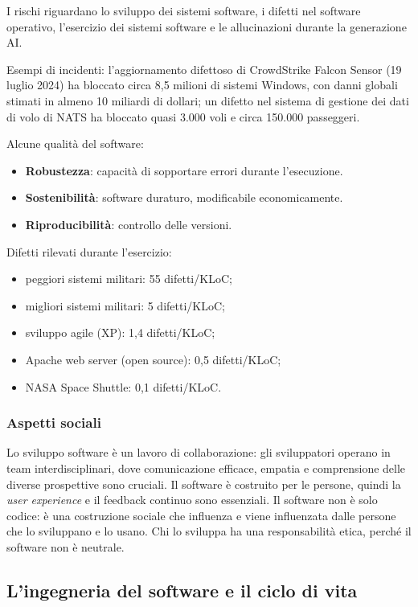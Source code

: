 \documentclass[a4paper,12pt]{article}
\begin{document}
I rischi riguardano lo sviluppo dei sistemi software, i difetti nel software operativo,
l'esercizio dei sistemi software e le allucinazioni durante la generazione AI.

Esempi di incidenti: l'aggiornamento difettoso di CrowdStrike Falcon Sensor
(19 luglio 2024) ha bloccato circa 8,5 milioni di sistemi Windows, con danni globali
stimati in almeno 10 miliardi di dollari; un difetto nel sistema di gestione dei dati
di volo di NATS ha bloccato quasi 3.000 voli e circa 150.000 passeggeri.

Alcune qualità del software:
\begin{itemize}
  \item \textbf{Robustezza}: capacità di sopportare errori durante l'esecuzione.
  \item \textbf{Sostenibilità}: software duraturo, modificabile economicamente.
  \item \textbf{Riproducibilità}: controllo delle versioni.
\end{itemize}

Difetti rilevati durante l'esercizio:
\begin{itemize}
  \item peggiori sistemi militari: 55 difetti/KLoC;
  \item migliori sistemi militari: 5 difetti/KLoC;
  \item sviluppo agile (XP): 1,4 difetti/KLoC;
  \item Apache web server (open source): 0,5 difetti/KLoC;
  \item NASA Space Shuttle: 0,1 difetti/KLoC.
\end{itemize}

\subsubsection{Aspetti sociali}

Lo sviluppo software è un lavoro di collaborazione: gli sviluppatori operano in team
interdisciplinari, dove comunicazione efficace, empatia e comprensione delle diverse
prospettive sono cruciali. Il software è costruito per le persone, quindi la
\emph{user experience} e il feedback continuo sono essenziali. Il software non è solo
codice: è una costruzione sociale che influenza e viene influenzata dalle persone che
lo sviluppano e lo usano. Chi lo sviluppa ha una responsabilità etica, perché il
software non è neutrale.

\subsection{L'ingegneria del software e il ciclo di vita}
\end{document}
